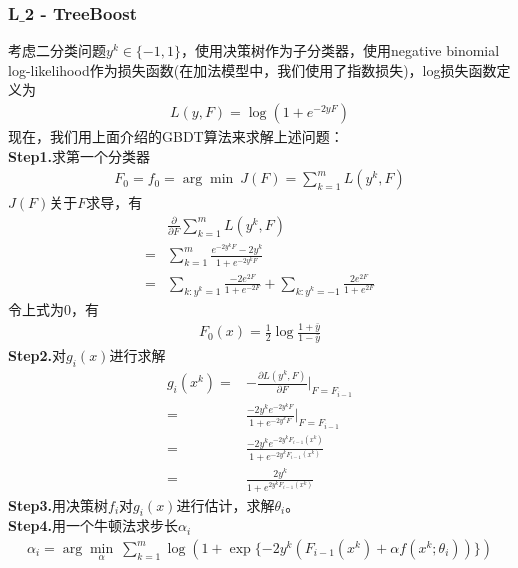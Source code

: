           \subsubsection{L$\_$2 - TreeBoost}
              \par
              考虑二分类问题$y^k\in \{-1,1\}$，使用决策树作为子分类器，使用negative binomial log-likelihood作为损失函数(在加法模型中，我们使用了指数损失)，log损失函数定义为
              \begin{align*}
              L(y,F) = \log (1+e^{-2yF})
              \end{align*}
              现在，我们用上面介绍的GBDT算法来求解上述问题：\\
              \textbf{Step1.}求第一个分类器
              \begin{align*}
              F_0 = f_0 = \arg\min\ J(F) = \sum_{k=1}^m L(y^k,F)
              \end{align*}
              $J(F)$关于$F$求导，有
              \begin{align*}
              &\frac{\partial }{\partial F} \sum_{k=1}^m L(y^k,F)\\
              ={} &\sum_{k=1}^m \frac{e^{-2y^k F} -2y^k}{1+e^{-2y^k F}}\\
              ={} &\sum_{k:y^k=1}\frac{-2e^{2F}}{1+e^{-2F}}+ \sum_{k:y^k = -1}\frac{2e^{2F}}{1+e^{2F}}
              \end{align*}
              令上式为0，有
              \begin{align*}
              F_0(x) = \frac{1}{2}\log \frac{1+\bar{y}}{1-\bar{y}}
              \end{align*}
              \textbf{Step2.}对$g_i(x)$进行求解
              \begin{align*}
              g_i(x^k) =& -\frac{\partial L(y^k,F)}{\partial F}\bigg|_{F = F_{i-1}}\\
              =& \frac{-2y^k e^{-2y^k F}}{1+e^{-2y^kF}}\bigg|_{F = F_{i-1}}\\
              =& \frac{-2y^k e^{-2y^k F_{i-1}(x^k)}}{1+e^{-2y^k F_{i-1}(x^k)}}\\
              =& \frac{2y^k}{1+e^{2y^k F_{i-1}(x^k)}}
              \end{align*}
              \textbf{Step3.}用决策树$f_i$对$g_i(x)$进行估计，求解$\theta_i$。\\
              \textbf{Step4.}用一个牛顿法求步长$\alpha_i$
              \begin{align*}
              \alpha_i = \arg\min_\alpha\ \sum_{k=1}^m \log (1+\exp\{-2y^k(F_{i-1}(x^k)+\alpha f(x^k;\theta_i))\})
              \end{align*}
